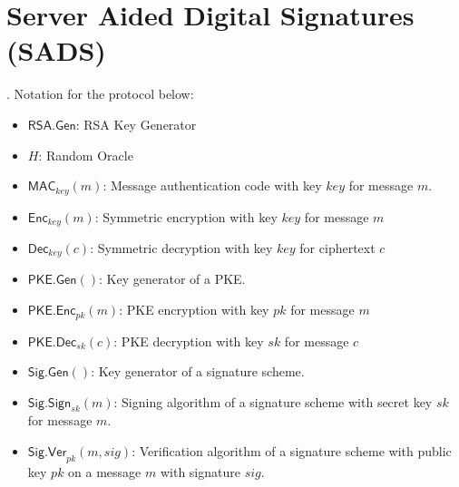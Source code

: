 \section{Server Aided Digital Signatures (SADS)}
. 
Notation for the protocol below:
\begin{itemize}
    \item $\mathsf{RSA.Gen}$: RSA Key Generator
    \item $H$: Random Oracle
    \item $\mathsf{MAC}_{key}(m)$: Message authentication code with key $key$ for message $m$.
    \item $\mathsf{Enc}_{key}(m)$: Symmetric encryption with key $key$ for message $m$
    \item $\mathsf{Dec}_{key}(c)$: Symmetric decryption with key $key$ for ciphertext $c$
    \item $\mathsf{PKE.Gen}()$: Key generator of a PKE.
    \item $\mathsf{PKE.Enc}_{pk}(m)$: PKE encryption with key $pk$ for message $m$
    \item $\mathsf{PKE.Dec}_{sk}(c)$: PKE decryption with key $sk$ for message $c$
    \item $\mathsf{Sig.Gen}()$: Key generator of a signature scheme.
    \item $\mathsf{Sig.Sign}_{sk}(m)$: Signing algorithm of a signature scheme with secret key $sk$ for message $m$.
    \item $\mathsf{Sig.Ver}_{pk}(m, sig)$: Verification algorithm of a signature scheme with public key $pk$ on a message $m$ with signature $sig$.
    
\end{itemize}
